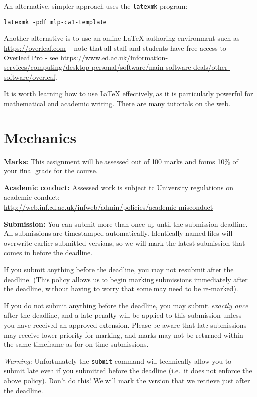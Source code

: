 \documentclass[11pt,]{article}
\begin{document}
An alternative, simpler approach uses the \verb+latexmk+ program:
\begin{verbatim}
latexmk -pdf mlp-cw1-template
\end{verbatim}

Another alternative is to use an online LaTeX authoring environment such as \url{https://overleaf.com} -- note that all staff and students have free access to Overleaf Pro - see \url{https://www.ed.ac.uk/information-services/computing/desktop-personal/software/main-software-deals/other-software/overleaf}.

It is worth learning how to use LaTeX effectively, as it is particularly powerful for mathematical and academic writing.  There are many tutorials on the web.


\section{Mechanics}
\label{sec:mechanics}

\textbf{Marks:} 
This assignment will be assessed out of 100 marks and forms 10\% of your final grade for the course.

\textbf{Academic conduct:} 
Assessed work is subject to University
regulations on academic
conduct:\\ {\small \url{http://web.inf.ed.ac.uk/infweb/admin/policies/academic-misconduct}}

\textbf{Submission:} 
You can submit more than once up until the submission deadline. All
submissions are timestamped automatically. Identically named files
will overwrite earlier submitted versions, so we will mark the latest
submission that comes in before the deadline.

If you submit anything before the deadline, you may not resubmit
after the deadline. (This policy allows us to begin marking submissions
immediately after the deadline, without having to worry that some may
need to be re-marked).

If you do not submit anything before the deadline, you may submit {\em
exactly once} after the deadline, and a late penalty will be applied
to this submission unless you have received an approved extension.
Please be aware that late submissions may receive lower priority for
marking, and marks may not be returned within the same timeframe as
for on-time submissions.

{\em Warning:} Unfortunately the \verb+submit+ command will technically
allow you to submit late even if you submitted before the deadline
(i.e.\ it does not enforce the above policy). Don't do this! We will
mark the version that we retrieve just after the deadline.
\end{document}

